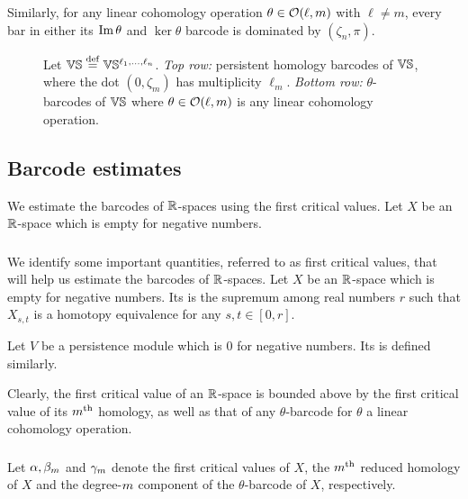 Similarly, for any linear cohomology operation $\theta \in \mathcal{O}(\ell,m)$ with $\ell \neq m$, every bar in either its $\operatorname{Im}\theta$ and $\ker\theta$ barcode is dominated by $(\zeta_n, \pi)$.

\begin{figure}
	\centering
	
	\caption{Let $\mathbb{V}\mathbb{S}\stackrel{\mathrm{def}}{=} \mathbb{V}\mathbb{S}^{\ell_1,\dots,\ell_n}$. \emph{Top row:} persistent homology barcodes of $\mathbb{V}\mathbb{S}$, where the dot $(0,\zeta_m)$ has multiplicity $\ell_m$. 
        \emph{Bottom row:} $\theta$-barcodes of $\mathbb{V}\mathbb{S}$ where $\theta \in \mathcal{O}(\ell,m)$ is any linear cohomology operation.}
	\label{fig:barcodes_vs}
\end{figure}

\subsection{Barcode estimates}
\label{sub:general_barcodes}

We estimate the barcodes of $\mathbb{R}$-spaces using the first critical values.
Let $X$ be an $\mathbb{R}$-space which is empty for negative numbers.

\subsubsection{}
\label{subsub:first_critical_value}
We identify some important quantities, referred to as first critical values, that will help us estimate the barcodes of $\mathbb{R}$-spaces.
 Let $X$ be an $\mathbb{R}$-space which is empty for negative numbers.
Its  is the supremum among real numbers $r$ such that $X_{s,t}$ is a homotopy equivalence for any $s,t \in [0,r]$. 

Let $V$ be a persistence module which is $0$ for negative numbers.
Its  is defined similarly. 

\medskip\remark
Clearly, the first critical value of an $\mathbb{R}$-space is bounded above by the first critical value of its $m^{\mathrm{th}}$ homology, as well as that of any $\theta$-barcode for $\theta$ a linear cohomology operation.


\subsubsection{}
\label{subsub:barcode_general}
Let $\alpha, \beta_m$ and $\gamma_m$ denote the first critical values of $X$, the $m^{\mathrm{th}}$ reduced homology of $X$ and the degree-$m$ component of the $\theta$-barcode of $X$, respectively.

